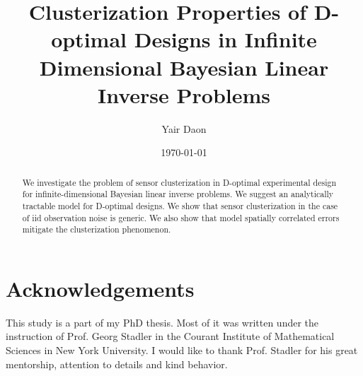 \documentclass{amsart}
\numberwithin{equation}{section}
\begin{document}
\title[Clusterization Properties of D-optimal Designs]{Clusterization
  Properties of D-optimal Designs in Infinite Dimensional Bayesian
  Linear Inverse Problems}

\author{Yair Daon}
\address{Porter School of the Environment and Earth
  Sciences, Tel Aviv University\\ Tel Aviv, Israel}

\date{\today}

\begin{abstract}
  We investigate the problem of sensor clusterization in D-optimal
  experimental design for infinite-dimensional Bayesian linear inverse
  problems. We suggest an analytically tractable model for D-optimal
  designs. We show that sensor clusterization in the case of iid
  observation noise is generic. We also show that model spatially
  correlated errors mitigate the clusterization phenomenon.

\end{abstract}

\maketitle









\section{Acknowledgements}
This study is a part of my PhD thesis. Most of it was written under
the instruction of Prof. Georg Stadler in the Courant Institute of
Mathematical Sciences in New York University. I would like to thank
Prof. Stadler for his great mentorship, attention to details and kind
behavior.
\end{document}
